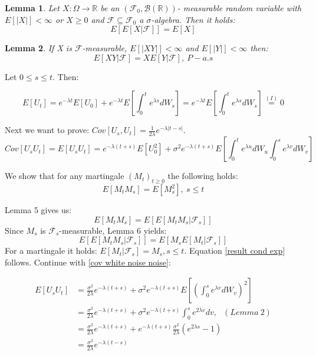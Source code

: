 \documentclass[%
thesis=student,%
coverpage=false,%
titlepage=false,%
headmarks=true, %
english,%
font=libertine, %
math=newpxtx, %
BCOR=5mm,%
coverBCOR=11mm%
]{tumbook}
\newtheorem{lemma}{Lemma}
\begin{document}
\begin{lemma}
    Let $X: \Omega \rightarrow \mathbb{R}$ be an $(\mathcal{F}_{0},\mathcal{B}(\mathbb{R}))$- measurable random variable with $E[\lvert X \rvert] < \infty$ or $X \geq 0$ and $\mathcal{F} \subseteq \mathcal{F}_{0}$ a $\sigma$-algebra. Then it holds:
    \[
    E[E[X|\mathcal{F}]] = E[X]
    \]
\end{lemma}

\begin{lemma}
    If X is $\mathcal{F}$-measurable, $E[\lvert XY \rvert] < \infty$ and $E[\lvert Y \rvert]< \infty$ then:
    \[
    E[XY|\mathcal{F}] = XE[Y|\mathcal{F}], \ P-a.s
    \]
\end{lemma}

Let $0 \leq s \leq t$. Then:

\[
E[U_{t}] = e^{-\lambda t}E[U_{0}] + e^{-\lambda t}E[\int_{0}^{t} e^{\lambda s} dW_{s}] = e^{-\lambda t}E[\int_{0}^{t} e^{\lambda s} dW_{s}] \stackrel{(I)}{=}  0
\]

Next we want to prove: $Cov[U_{s},U_{t}] = \frac{1}{2\lambda}e^{-\lambda \lvert t-s \rvert}$. 
\begin{equation}
    Cov[U_{s}U_{t}]=E[U_{s}U_{t}] = e^{-\lambda(t+s)}E[U_{0}^{2}] + \sigma^2 e^{-\lambda(t+s)}E[\int_{0}^{t}e^{\lambda u}dW_{u}\int_{0}^{s}e^{\lambda v}dW_{v}]
    \label{cov white noise noise}
\end{equation}

We show that for any martingale $(M_{t})_{t \geq 0}$ the following holds: 
\begin{equation}
    E[M_{t}M_{s}] = E[M_{s}^{2}], \ s \leq t
    \label{result cond exp}
\end{equation}

Lemma 5 gives us:
\[
E[M_{t}M_{s}] = E[E[M_{t}M_{s}|\mathcal{F}_{s}]]
\]
Since $M_{s}$ is $\mathcal{F}_{s}$-measurable, Lemma 6 yields:
\[
E[E[M_{t}M_{s}|\mathcal{F}_{s}]] = E[M_{s}E[M_{t}|\mathcal{F}_{s}]]
\]
For a martingale it holds: $E[M_{t}|\mathcal{F}_{s}] = M_{s}, s \leq t$. Equation \ref{result cond exp} follows. Continue with \ref{cov white noise noise}:


\begin{subequations}
    \begin{align*}
        E[U_{s}U_{t}] &= \frac{\sigma^2}{2\lambda}e^{-\lambda(t+s)} + \sigma^2 e^{-\lambda(t+s)}E[(\int_{0}^{s}e^{\lambda v}dW_{v})^{2}]   \\
         &= \frac{\sigma^2}{2\lambda}e^{-\lambda(t+s)} + \sigma^2 e^{-\lambda(t+s)}\int_{0}^{s}e^{2\lambda v}dv, \ \ \ (Lemma \ 2) \\
         &= \frac{\sigma^2}{2\lambda}e^{-\lambda(t+s)} + e^{-\lambda(t+s)}\frac{\sigma^2}{2\lambda}(e^{2\lambda s} - 1) \\
         &= \frac{\sigma^2}{2\lambda}e^{-\lambda(t-s)} 
    \end{align*}
\end{subequations}   
\end{document}
